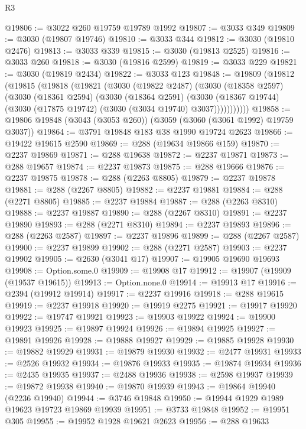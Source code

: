\begin{lexlean}{R3}
\begin{coremodule}
@19806 := @3022 @260 @19759 @19789 @1992
@19807 := @3033 @349
@19809 := @3030 (@19807 @19746)
@19810 := @3033 @344
@19812 := @3030 (@19810 @2476)
@19813 := @3033 @339
@19815 := @3030 (@19813 @2525)
@19816 := @3033 @260
@19818 := @3030 (@19816 @2599)
@19819 := @3033 @229
@19821 := @3030 (@19819 @2434)
@19822 := @3033 @123
@19848 := @19809
    (@19812
      (@19815
        (@19818
          (@19821
            (@3030
              (@19822 @2487)
              (@3030
                (@18358 @2597)
                (@3030
                  (@18361 @2594)
                  (@3030
                    (@18364 @2591)
                    (@3030
                      (@18367 @19744)
                      (@3030 (@17875 @19742) (@3030 (@3034 @19740) @3037)))))))))))
@19858 := @19806 @19848 (@3043 (@3053 @260)) (@3059 (@3060 (@3061 @1992) @19759 @3037))
@19864 := @3791 @19848 @183 @38 @1990 @19724 @2623
@19866 := @19422 @19615 @2590
@19869 := @288 (@19634 @19866 @159)
@19870 := @2237 @19869
@19871 := @288 @19638
@19872 := @2237 @19871
@19873 := @288 @19657
@19874 := @2237 @19873
@19875 := @288 @19666
@19876 := @2237 @19875
@19878 := @288 (@2263 @8805)
@19879 := @2237 @19878
@19881 := @288 (@2267 @8805)
@19882 := @2237 @19881
@19884 := @288 (@2271 @8805)
@19885 := @2237 @19884
@19887 := @288 (@2263 @8310)
@19888 := @2237 @19887
@19890 := @288 (@2267 @8310)
@19891 := @2237 @19890
@19893 := @288 (@2271 @8310)
@19894 := @2237 @19893
@19896 := @288 (@2263 @2587)
@19897 := @2237 @19896
@19899 := @288 (@2267 @2587)
@19900 := @2237 @19899
@19902 := @288 (@2271 @2587)
@19903 := @2237 @19902
@19905 := @2630 (@3041 @17)
@19907 := @19905 @19690 @19693
@19908 := Option.some.{0}
@19909 := @19908 @17
@19912 := @19907 (@19909 (@19537 @19615))
@19913 := Option.none.{0}
@19914 := @19913 @17
@19916 := @2394 (@19912 @19914)
@19917 := @2237 @19916
@19918 := @288 @19615
@19919 := @2237 @19918
@19920 := @19919 @2275
@19921 := @19917 @19920
@19922 := @19747 @19921
@19923 := @19903 @19922
@19924 := @19900 @19923
@19925 := @19897 @19924
@19926 := @19894 @19925
@19927 := @19891 @19926
@19928 := @19888 @19927
@19929 := @19885 @19928
@19930 := @19882 @19929
@19931 := @19879 @19930
@19932 := @2477 @19931
@19933 := @2526 @19932
@19934 := @19876 @19933
@19935 := @19874 @19934
@19936 := @2435 @19935
@19937 := @2488 @19936
@19938 := @2598 @19937
@19939 := @19872 @19938
@19940 := @19870 @19939
@19943 := @19864 @19940 (@2236 @19940)
@19944 := @3746 @19848
@19950 := @19944 @1929 @1989 @19623 @19723 @19869 @19939
@19951 := @3733 @19848
@19952 := @19951 @305
@19955 := @19952 @1928 @19621 @2623
@19956 := @288 @19633

\end{coremodule}
\end{lexlean}

